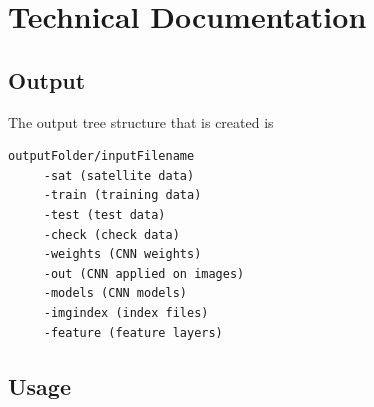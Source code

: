 \documentclass[fleqn,10pt]{SelfArx} %
\begin{document}



\newpage
\section*{Technical Documentation}
\subsection*{Output}
The output tree structure that is created is
\begin{lstlisting}
outputFolder/inputFilename
 	 -sat (satellite data)
	 -train (training data)
	 -test (test data)
	 -check (check data)
	 -weights (CNN weights)
	 -out (CNN applied on images)
	 -models (CNN models)
	 -imgindex (index files)
	 -feature (feature layers) 
\end{lstlisting}
\subsection*{Usage} %
\end{document}

